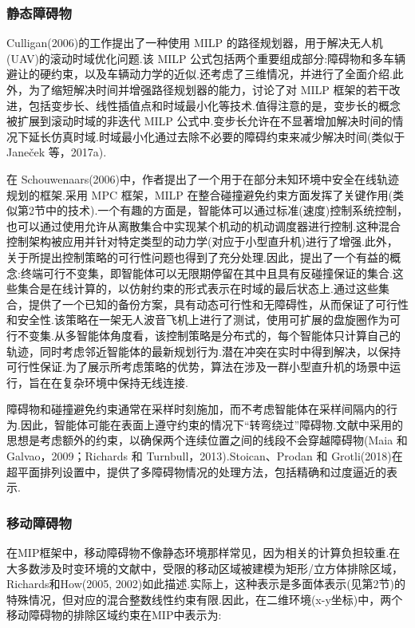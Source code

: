 \documentclass[10pt]{article}
\begin{document}
\subsubsection*{静态障碍物}

Culligan(2006)的工作提出了一种使用 MILP 的路径规划器，用于解决无人机(UAV)的滚动时域优化问题.该 MILP 公式包括两个重要组成部分:障碍物和多车辆避让的硬约束，以及车辆动力学的近似.还考虑了三维情况，并进行了全面介绍.此外，为了缩短解决时间并增强路径规划器的能力，讨论了对 MILP 框架的若干改进，包括变步长、线性插值点和时域最小化等技术.值得注意的是，变步长的概念被扩展到滚动时域的非迭代 MILP 公式中.变步长允许在不显著增加解决时间的情况下延长仿真时域.时域最小化通过去除不必要的障碍约束来减少解决时间(类似于 Janeček 等，2017a).



在 Schouwenaars(2006)中，作者提出了一个用于在部分未知环境中安全在线轨迹规划的框架.采用 MPC 框架，MILP 在整合碰撞避免约束方面发挥了关键作用(类似第2节中的技术).一个有趣的方面是，智能体可以通过标准(速度)控制系统控制，也可以通过使用允许从离散集合中实现某个机动的机动调度器进行控制.这种混合控制架构被应用并针对特定类型的动力学(对应于小型直升机)进行了增强.此外，关于所提出控制策略的可行性问题也得到了充分处理.因此，提出了一个有益的概念:终端可行不变集，即智能体可以无限期停留在其中且具有反碰撞保证的集合.这些集合是在线计算的，以仿射约束的形式表示在时域的最后状态上.通过这些集合，提供了一个已知的备份方案，具有动态可行性和无障碍性，从而保证了可行性和安全性.该策略在一架无人波音飞机上进行了测试，使用可扩展的盘旋圈作为可行不变集.从多智能体角度看，该控制策略是分布式的，每个智能体只计算自己的轨迹，同时考虑邻近智能体的最新规划行为.潜在冲突在实时中得到解决，以保持可行性保证.为了展示所考虑策略的优势，算法在涉及一群小型直升机的场景中运行，旨在在复杂环境中保持无线连接.

障碍物和碰撞避免约束通常在采样时刻施加，而不考虑智能体在采样间隔内的行为.因此，智能体可能在表面上遵守约束的情况下“转弯绕过”障碍物.文献中采用的思想是考虑额外的约束，以确保两个连续位置之间的线段不会穿越障碍物(Maia 和 Galvao，2009；Richards 和 Turnbull，2013).Stoican、Prodan 和 Grotli(2018)在超平面排列设置中，提供了多障碍物情况的处理方法，包括精确和过度逼近的表示.

\subsubsection*{移动障碍物}

在MIP框架中，移动障碍物不像静态环境那样常见，因为相关的计算负担较重.在大多数涉及时变环境的文献中，受限的移动区域被建模为矩形/立方体排除区域，Richards和How(2005, 2002)如此描述.实际上，这种表示是多面体表示(见第2节)的特殊情况，但对应的混合整数线性约束有限.因此，在二维环境(x-y坐标)中，两个移动障碍物的排除区域约束在MIP中表示为:
\end{document}

